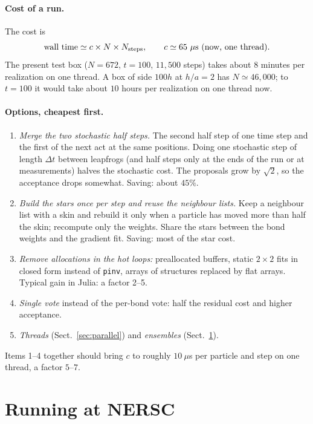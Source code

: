 \documentclass[11pt,aps,preprint,nofootinbib,superscriptaddress,tightenlines]{revtex4-2}
\def\st{\begin{equation}}
\def\stp{\end{equation}}
\def\Sect#1{Sect.~\ref{#1}}
\let\oldparagraph\paragraph
\renewcommand{\paragraph}{\par\bigskip\oldparagraph}
\begin{document}
\paragraph{Cost of a run.}  The cost is
\st
\text{wall time}\simeq c\times N\times N_{\rm steps},\qquad c\simeq65\ \mu{\rm s}\ (\text{now, one thread}).
\stp
The present test box ($N=672$, $t=100$, $11{,}500$ steps) takes about 8 minutes
per realization on one thread.  A box of side $100h$ at $h/a=2$ has $N\simeq46{,}000$;
to $t=100$ it would take about $10$ hours per realization on one thread now.

\paragraph{Options, cheapest first.}
\begin{enumerate}
\item \emph{Merge the two stochastic half steps.}  The second half step of one
  time step and the first of the next act at the same positions.  Doing one
  stochastic step of length $\Delta t$ between leapfrogs (and half steps only at
  the ends of the run or at measurements) halves the stochastic cost.  The
  proposals grow by $\sqrt2$, so the acceptance drops somewhat.  Saving: about
  $45\%$.
\item \emph{Build the stars once per step and reuse the neighbour lists.}
  Keep a neighbour list with a skin and rebuild it only when a particle has moved
  more than half the skin; recompute only the weights.  Share the stars between
  the bond weights and the gradient fit.  Saving: most of the star cost.
\item \emph{Remove allocations in the hot loops:} preallocated buffers,
  static $2\times2$ fits in closed form instead of \texttt{pinv}, arrays of
  structures replaced by flat arrays.  Typical gain in Julia: a factor 2--5.
\item \emph{Single vote} instead of the per-bond vote: half the residual cost
  and higher acceptance.
\item \emph{Threads} (\Sect{sec:parallel}) and \emph{ensembles} (\Sect{sec:nersc}).
\end{enumerate}
Items 1--4 together should bring $c$ to roughly $10\ \mu$s per particle and step on
one thread, a factor $5$--$7$.

\section{Running at NERSC}
\label{sec:nersc}
\end{document}
